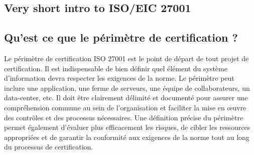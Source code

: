 \subsection{Very short intro to ISO/EIC 27001}



\subsection{Qu’est ce que le périmètre de certification ?}

Le périmètre de certification ISO 27001 est le point de départ de tout projet de certification. Il est indispensable de bien définir quel élément du système d'information devra respecter les exigences de la norme. Le périmètre peut inclure une application, une ferme de serveurs, une équipe de collaborateurs, un data-center, etc. Il doit être clairement délimité et documenté pour assurer une compréhension commune au sein de l'organisation et faciliter la mise en œuvre des contrôles et des processus nécessaires. Une définition précise du périmètre permet également d’évaluer plus efficacement les risques, de cibler les ressources appropriées et de garantir la conformité aux exigences de la norme tout au long du processus de certification.



